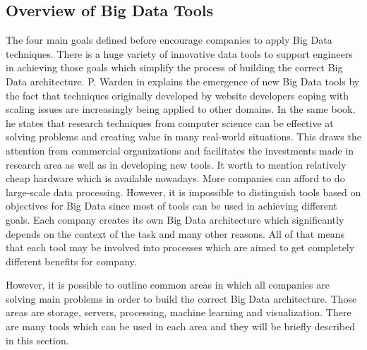 \documentclass[runningheads]{llncs}
\begin{document}
\subsection{Overview of Big Data Tools}

The four main goals defined before encourage companies to apply Big Data techniques. There is a huge variety of innovative data tools to support engineers in achieving those goals which simplify the process of building the correct Big Data architecture. P. Warden in \cite{GLOSSARY} explains the emergence of new Big Data tools by the fact that techniques originally developed by website developers coping with scaling issues are increasingly being applied to other domains. In the same book, he states that research techniques from computer science can be effective at solving problems and creating value in many real-world situations. This draws the attention from commercial organizations and facilitates the investments made in research area as well as in developing new tools. It worth to mention relatively cheap hardware which is available nowadays. More companies can afford to do large-scale data processing. However, it is impossible to distinguish tools based on objectives for Big Data since most of tools can be used in achieving different goals. Each company creates its own Big Data architecture which significantly depends on the context of the task and many other reasons. All of that means that each tool may be involved into processes which are aimed to get completely different benefits for company.   

However, it is possible to outline common areas in which all companies are solving main problems in order to build the correct Big Data architecture. Those areas are storage, servers, processing, machine learning and visualization. There are many tools which can be used in each area and they will be briefly described in this section. 
\end{document}

